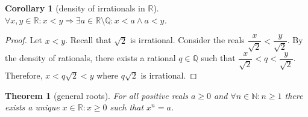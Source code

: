 \documentclass{article}
\newcommand\N{\ensuremath{\mathbb{N}}}
\newcommand\R{\ensuremath{\mathbb{R}}}
\newcommand\Q{\ensuremath{\mathbb{Q}}}
\newtheorem{theorem}{Theorem}[section]
\newtheorem{corollary}{Corollary}[theorem]
\theoremstyle{definition}
\theoremstyle{remark}
\theoremstyle{plain}
\begin{document}
\begin{corollary}[density of irrationals in \(\R\)]
    \(\forall x,y \in \R: x < y \Rightarrow \exists a \in \R\setminus \Q: x < a \land a < y\).
\end{corollary}
\begin{proof}
    Let \(x < y\). Recall that \(\sqrt{2}\) is irrational. Consider the reals \(\dfrac{x}{\sqrt{2}} < \dfrac{y}{\sqrt{2}}\). By the density of rationals, there exists a rational 
    \(q \in \Q\) such that \(\dfrac{x}{\sqrt{2}} < q < \dfrac{y}{\sqrt{2}}\). Therefore, 
    \(x < q\sqrt{2} < y\) where \(q\sqrt{2}\) is irrational.
\end{proof}
     

\begin{theorem}[general roots]
    For all positive reals \(a \geq 0\) and \(\forall n \in \N: n \geq 1\) there exists a unique \(x \in \R: x \geq 0\) such that 
    \(x^n = a\).
\end{theorem}
\end{document}
